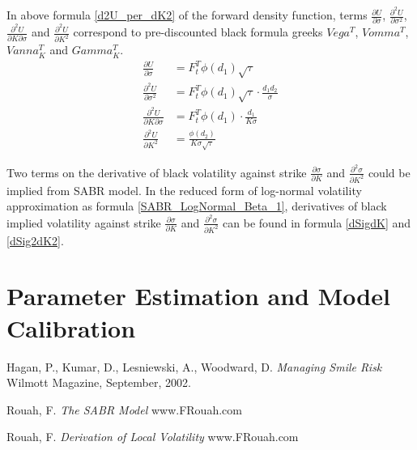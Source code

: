 \documentclass{article}
\begin{document}
In above formula \ref{d2U_per_dK2} of the forward density function, terms $ \frac{\partial U}{\partial \sigma} $, $ \frac{\partial^2 U}{\partial \sigma^2} $, $ \frac{\partial^2 U}{\partial K \partial \sigma} $ and $ \frac{\partial^2 U}{\partial K^2} $ correspond to pre-discounted black formula greeks $ Vega^T $, $ Vomma^T $, $ Vanna_{K}^T $ and $ Gamma_{K}^T $.
\begin{subequations}
    \begin{align}
        \frac{\partial U}{\partial \sigma} &= F_{t}^{T} \phi(d_1) \sqrt{\tau} \\
        \frac{\partial^2 U}{\partial \sigma^2} &= F_{t}^{T} \phi(d_1) \sqrt{\tau} \cdot \frac{d_1 d_2}{\sigma} \\
        \frac{\partial^2 U}{\partial K \partial \sigma} &= F_{t}^{T} \phi(d_1) \cdot \frac{d_1}{K \sigma} \\
        \frac{\partial^2 U}{\partial K^2} &= \frac{\phi(d_2)}{K \sigma \sqrt{\tau}}
    \end{align}
\end{subequations}

Two terms on the derivative of black volatility against strike $ \frac{\partial \sigma}{\partial K} $ and $ \frac{\partial^2 \sigma}{\partial K^2} $ could be implied from SABR model.
In the reduced form of log-normal volatility approximation as formula \ref{SABR_LogNormal_Beta_1}, derivatives of black implied volatility against strike $ \frac{\partial \sigma}{\partial K} $ and $ \frac{\partial^2 \sigma}{\partial K^2} $ can be found in formula \ref{dSigdK} and \ref{dSig2dK2}.


\section{Parameter Estimation and Model Calibration}



\begin{thebibliography}{9}
    Hagan, P., Kumar, D., Lesniewski, A., Woodward, D.
    \textit{Managing Smile Risk}
    Wilmott Magazine, September, 2002.
    
    Rouah, F.
    \textit{The SABR Model}
    www.FRouah.com
    
    Rouah, F.
    \textit{Derivation of Local Volatility}
    www.FRouah.com
\end{thebibliography}
\end{document}
